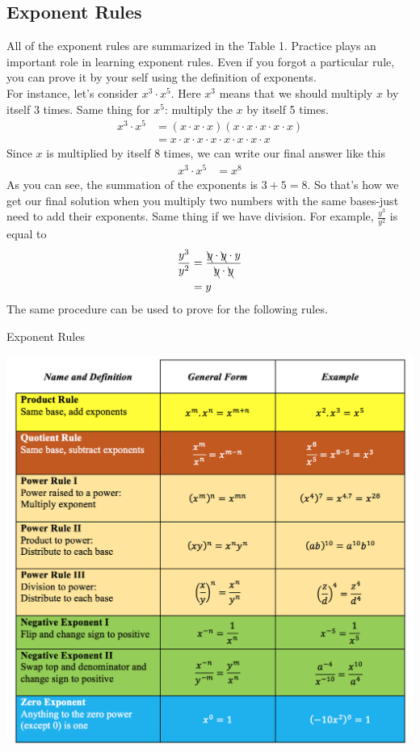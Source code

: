 \subsection{Exponent Rules}
All of the exponent rules are summarized in the Table 1. Practice plays an important
role in learning exponent rules. Even if you forgot a particular rule, you can
prove it by your self using the definition of exponents.\\
For instance, let's consider $x^3\cdot x^5$. Here $x^3$ means that we should multiply $x$
by itself 3 times. Same thing for $x^5$: multiply the $x$ by itself 5 times.
\begin{align*}
	x^3\cdot x^5&=(x\cdot x\cdot x)(x\cdot x \cdot x \cdot x \cdot x) \\
				& = 	x\cdot x\cdot x\cdot x\cdot x \cdot x \cdot x \cdot x
\end{align*}
Since $x$ is multiplied by itself 8 times, we can write our final answer like this
\begin{align*}
	x^3\cdot x^5&= x^8
\end{align*}
As you can see, the summation of the exponents is $3+5=8$. So that's how we get our final solution when you multiply two numbers with the same bases-just need to add their exponents. Same thing if we have division. For example, $\displaystyle \frac{y^3}{y^2}$ is equal to
\begin{align*}
    \frac{y^3}{y^2} &= \frac{\bcancel{y}\cdot \bcancel{y}\cdot y}{\bcancel{y}\cdot \bcancel{y}}  \\
                    & = y
\end{align*}
\newpage
The same procedure can be used to prove for the following rules.
\begin{table}[h]
\begin{center}
    \caption{Exponent Rules}
	\includegraphics[width=\linewidth]{pics/exponent_rules.png}
	\label{tbl:exp_rules}
\end{center}
\end{table}

